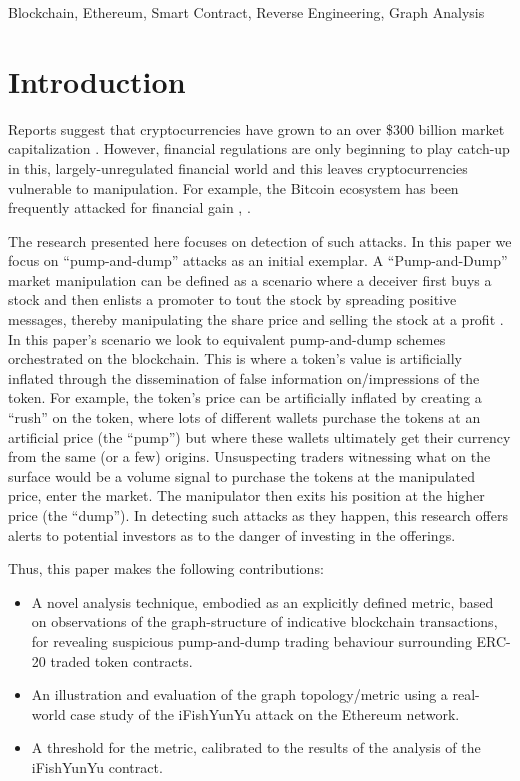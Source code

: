 \documentclass[conference]{IEEEtran}
\begin{document}
\begin{IEEEkeywords}
Blockchain, Ethereum, Smart Contract, Reverse Engineering, Graph Analysis
\end{IEEEkeywords}



\section{Introduction}

Reports suggest that cryptocurrencies have grown to an over \$300 billion market capitalization \cite{griffin2018tethered}. However, financial regulations are only beginning to play catch-up in this, largely-unregulated financial world and this leaves cryptocurrencies vulnerable to manipulation. For example, the Bitcoin ecosystem has been frequently attacked for financial gain \cite{griffin2018tethered}, \cite{Ganda12018PriceManip}.

The research presented here focuses on detection of such attacks. In this paper we focus on ``pump-and-dump'' attacks \cite{jiang2005market} as an initial exemplar. A ``Pump-and-Dump'' market manipulation can be defined as a scenario where a deceiver first buys a stock and then enlists a promoter to tout the stock by spreading positive messages, thereby manipulating the share price and selling the stock at a profit \cite{siering2019economics}.  In this paper's scenario we look to equivalent pump-and-dump schemes orchestrated on the blockchain.  This is where a token's value is artificially inflated through the dissemination of false information on/impressions of the token. For example, the token's price can be artificially inflated by creating a ``rush'' on the token, where lots of different wallets purchase the tokens at an artificial price (the ``pump'') but where these wallets ultimately get their currency from the same (or a few) origins. Unsuspecting traders witnessing what on the surface would be a volume signal to purchase the tokens at the manipulated price, enter the market.  The manipulator then exits his position at the higher price (the ``dump''). In detecting such attacks as they happen, this research offers alerts to potential investors as to the danger of investing in the offerings.

Thus, this paper makes the following contributions:

\begin{itemize}
    \item A novel analysis technique, embodied as an explicitly defined metric, based on observations of the graph-structure of indicative blockchain transactions, for revealing suspicious pump-and-dump trading behaviour surrounding ERC-20 \cite{vogelstellerbuterin} traded token contracts.
    \item An illustration and evaluation of the graph topology/metric using a real-world case study of the iFishYunYu attack on the Ethereum network.
    \item A threshold for the metric, calibrated to the results of the analysis of the iFishYunYu contract.
\end{itemize}
\end{document}
